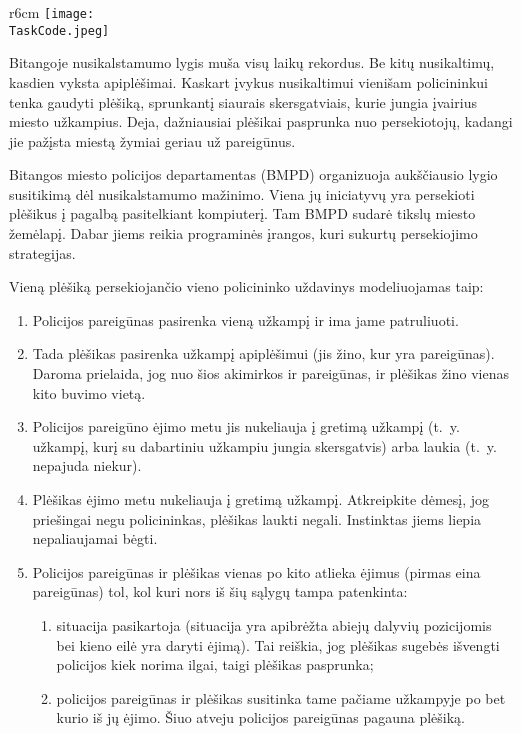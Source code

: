 \documentclass{boi2014-lt}
\renewcommand{\TaskCode}{coprobber}
\begin{document}
    \begin{wrapfigure}[11]{r}{6cm}
		\texttt{[image: \\TaskCode.jpeg]}
	\end{wrapfigure}

	Bitangoje nusikalstamumo lygis muša visų laikų rekordus. Be kitų
	nusikaltimų, kasdien vyksta apiplėšimai. Kaskart įvykus nusikaltimui vienišam
	policininkui tenka gaudyti plėšiką, sprunkantį siaurais skersgatviais, kurie
	jungia įvairius miesto užkampius. Deja, dažniausiai plėšikai
	pasprunka nuo persekiotojų, kadangi jie pažįsta miestą žymiai geriau už
	pareigūnus.

	Bitangos miesto policijos departamentas (BMPD) organizuoja aukščiausio
	lygio susitikimą dėl nusikalstamumo mažinimo. Viena jų iniciatyvų yra
	persekioti plėšikus į pagalbą pasitelkiant kompiuterį. Tam BMPD sudarė
	tikslų miesto žemėlapį. Dabar jiems reikia programinės įrangos, kuri
	sukurtų persekiojimo strategijas.

	Vieną plėšiką persekiojančio vieno policininko uždavinys modeliuojamas taip:
	\begin{enumerate}
		\item Policijos pareigūnas pasirenka vieną užkampį ir ima jame
			patruliuoti.
		\item Tada plėšikas pasirenka užkampį apiplėšimui (jis žino, kur yra
			pareigūnas). Daroma prielaida, jog nuo šios akimirkos ir
			pareigūnas, ir plėšikas žino vienas kito buvimo vietą.
		\item Policijos pareigūno ėjimo metu jis nukeliauja į gretimą užkampį
			(t.~y. užkampį, kurį su dabartiniu užkampiu jungia skersgatvis)
			arba laukia (t.~y. nepajuda niekur).
		\item Plėšikas ėjimo metu nukeliauja į gretimą užkampį. Atkreipkite
			dėmesį, jog priešingai negu policininkas, plėšikas laukti negali.
			Instinktas jiems liepia nepaliaujamai bėgti.
		\item Policijos pareigūnas ir plėšikas vienas po kito atlieka ėjimus
			(pirmas eina pareigūnas) tol, kol kuri nors iš šių sąlygų tampa
			patenkinta:
			\begin{enumerate}
				\item situacija pasikartoja (situacija yra apibrėžta abiejų
					dalyvių pozicijomis bei kieno eilė yra daryti ėjimą).
					Tai reiškia, jog plėšikas sugebės išvengti policijos
					kiek norima ilgai, taigi plėšikas pasprunka;
				\item policijos pareigūnas ir plėšikas susitinka tame pačiame
					užkampyje po bet kurio iš jų ėjimo. Šiuo atveju policijos
					pareigūnas pagauna plėšiką.
			\end{enumerate}
	\end{enumerate}
\end{document}
